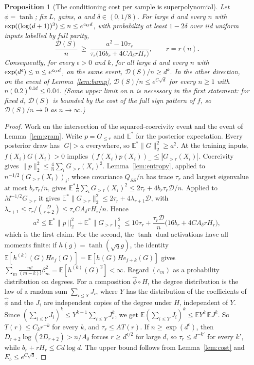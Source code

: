 \documentclass[11pt]{article}
\newtheorem{proposition}[theorem]{Proposition}
\theoremstyle{definition}\newtheorem{assumption}[theorem]{Assumption}
\theoremstyle{remark}\newtheorem{remark}[theorem]{Remark}
\newcommand{\E}{\mathbb E}
\begin{document}
\begin{proposition}[The conditioning cost per sample is superpolynomial]
\label{prop:obstruction}
Let $\phi=\tanh$; fix $L$, gains, $a$ and $\delta\in(0,1/8)$. For large $d$
and every $n$ with $\exp((\log(d+1))^3)\le n\le e^{c_{\rm G}d}$, with probability
at least $1-2\delta$ over iid uniform inputs labelled by full parity,
\[
 \frac{\mathcal D(S)}n\ \ge\ \frac{a^2-10\tau_r}
 {\tau_r\bigl(16b_r+4CA_\delta rH_r\bigr)} ,\qquad r=r(n).
\]
Consequently, for every $\epsilon>0$ and $k$, for all large $d$ and every
$n$ with $\exp(d^\epsilon)\le n\le e^{c_{\rm G}d}$, on the same event,
$\mathcal D(S)/n\ge d^k$. In the other direction, on the event of
Lemma~\ref{lem:bump}, $\mathcal D(S)/n\le e^{C\sqrt d}$ for every $n\ge1$ with $n(0.2)^{0.1d}\le0.04$.
(Some upper limit on $n$ is necessary in the first statement: for fixed $d$,
$\mathcal D(S)$ is bounded by the cost of the full sign pattern of $f$, so
$\mathcal D(S)/n\to0$ as $n\to\infty$.)
\end{proposition}
\begin{proof}
Work on the intersection of the squared-coercivity event and the event of
Lemma~\ref{lem:gram}. Write $p=G_{\le r}$ and $\E^*$ for the posterior
expectation. Every posterior draw has $|G|>a$ everywhere, so
$\E^*\|G\|_2^2\ge a^2$. At the training inputs, $f(X_i)G(X_i)>0$ implies
$(f(X_i)p(X_i))_-\le|G_{>r}(X_i)|$. Coercivity gives
$\|p\|_2^2\le\frac4n\sum_iG_{>r}(X_i)^2$. Lemma~\ref{lem:entropy}, applied
to $n^{-1/2}(G_{>r}(X_i))_i$, whose covariance $Q_{SS}/n$ has trace
$\tau_r$ and largest eigenvalue at most $b_r\tau_r/n$, gives
$\E^*\frac1n\sum_iG_{>r}(X_i)^2\le2\tau_r+4b_r\tau_r\mathcal D/n$.
Applied to $M^{-1/2}G_{>r}$ it gives
$\E^*\|G_{>r}\|_2^2\le2\tau_r+4\lambda_{r+1}\mathcal D$, with
$\lambda_{r+1}\le\tau_r/\binom D{r+2}\le\tau_rCA_\delta rH_r/n$. Hence
\[
 a^2\le\E^*\|p\|_2^2+\E^*\|G_{>r}\|_2^2
 \le10\tau_r+\frac{\tau_r\mathcal D}n\bigl(16b_r+4CA_\delta rH_r\bigr),
\]
which is the first claim. For the second, the $\tanh$ dual activations have
all moments finite: if $h(g)=\tanh(\sqrt qg)$, the identity
$\E[h^{(k)}(G)He_j(G)]=\E[h(G)He_{j+k}(G)]$ gives
$\sum_m\frac{m!}{(m-k)!}\beta_m^2=\E[h^{(k)}(G)^2]<\infty$. Regard $(c_m)$ as a probability distribution on degrees. For a
composition $\widehat\phi\circ H$, the degree distribution is the law of
a random sum $\sum_{i\le Y}J_i$, where $Y$ has the distribution of the
coefficients of $\widehat\phi$ and the $J_i$ are independent copies of
the degree under $H$, independent of $Y$. Since
$(\sum_{i\le Y}J_i)^k\le Y^{k-1}\sum_{i\le Y}J_i^k$, we get
$\E(\sum_{i\le Y}J_i)^k\le\E Y^k\,\E J^k$. So
$T(r)\le C_kr^{-k}$ for every $k$, and $\tau_r\le AT(r)$. If
$n\ge\exp(d^\epsilon)$, then $D_{r+2}\log(2D_{r+2})>n/A_\delta$ forces
$r\ge d^{\epsilon/2}$ for large $d$, so $\tau_r\le d^{-k'}$ for every $k'$,
while $b_r+rH_r\le Cd\log d$. The upper bound follows from
Lemma~\ref{lem:cost} and $E_b\le e^{C\sqrt d}$.
\end{proof}
\end{document}
